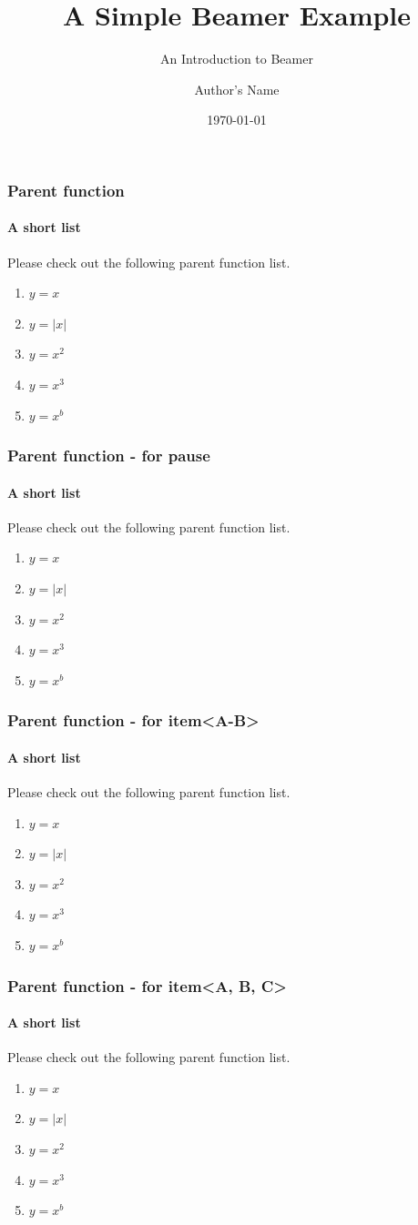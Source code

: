 \documentclass[aspectratio=169]{beamer} %
\title{A Simple Beamer Example} %
\subtitle{An Introduction to Beamer} %
\author{Author's Name} %
\institute{Author's Institute} %
\date{\today} %
\begin{document}
\titlepage %
\frame{\titlepage} %

\begin{frame}[c] 
    \frametitle{Parent function}
    \framesubtitle{A short list}
    Please check out the following parent function list.
    \begin{enumerate}
        \item $y=x$
        \item $y=|x|$
        \item $y=x^{2}$
        \item $y=x^{3}$
        \item $y=x^{b}$
    \end{enumerate}
\end{frame}

\begin{frame} 
    \frametitle{Parent function - for pause}
    \framesubtitle{A short list}
    Please check out the following parent function list.
    \begin{enumerate}
        \item $y=x$
        \pause
        \item $y=|x|$
        \pause
        \item $y=x^{2}$
        \pause
        \item $y=x^{3}$
        \pause
        \item $y=x^{b}$
    \end{enumerate}
\end{frame}

\begin{frame} 
    \frametitle{Parent function - for item<A-B>}
    \framesubtitle{A short list}
    Please check out the following parent function list.
    \begin{enumerate}
        \item<1-4> $y=x$
        \item<2-4> $y=|x|$
        \item<3-4> $y=x^{2}$
        \item<4-> $y=x^{3}$
        \item<4-> $y=x^{b}$
    \end{enumerate}
\end{frame}

\begin{frame} 
    \frametitle{Parent function - for item<A, B, C>}
    \framesubtitle{A short list}
    Please check out the following parent function list.
    \begin{enumerate}
        \item $y=x$
        \item $y=|x|$
        \item<2, 3, 4> $y=x^{2}$
        \item<3, 4> $y=x^{3}$
        \item<4> $y=x^{b}$
    \end{enumerate}
\end{frame}
\end{document}
